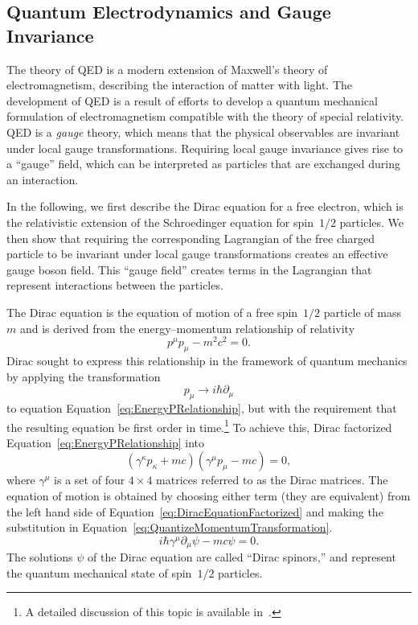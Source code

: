 \subsection{Quantum Electrodynamics and Gauge Invariance}
\label{sec:QEDandGaugeInvariance}
%
The theory of QED is a modern extension of Maxwell's theory of
electromagnetism, describing the interaction of matter with light.  The
development of QED is a result of efforts to develop a quantum mechanical
formulation of electromagnetism compatible with the theory of special relativity.
QED is a \emph{gauge} theory, which means that the physical observables are
invariant under local gauge transformations.  Requiring local gauge
invariance gives rise to a ``gauge'' field, which can be interpreted as 
particles that are exchanged during an interaction.  

In the following, we first describe the Dirac equation for a free electron,
which is the relativistic extension of the Schroedinger equation for spin~$1/2$
particles.  We then show that requiring the corresponding Lagrangian of the free
charged particle to be invariant under local gauge transformations creates an
effective gauge boson field.  This ``gauge field'' creates terms in the
Lagrangian that represent interactions between the particles.

The Dirac equation is the equation of motion of a free spin~$1/2$ particle of
mass~$m$ and is derived from the energy--momentum relationship of relativity
\begin{equation}
  p^{\mu}p_\mu - m^2c^2 = 0.
  \label{eq:EnergyPRelationship}
\end{equation}
Dirac sought to express this relationship in the framework of quantum mechanics
by applying the transformation
\begin{equation}
  p_\mu \to i \hbar \partial_\mu 
  \label{eq:QuantizeMomentumTransformation}
\end{equation}
to equation Equation~\ref{eq:EnergyPRelationship}, but with the requirement that
the resulting equation be first order in time.\footnote{A detailed
discussion of this topic is available in~\cite{Griffiths:IntroParticle}.}
To achieve this, Dirac factorized Equation~\ref{eq:EnergyPRelationship} into 
\begin{equation}
  (\gamma^\kappa p_\kappa + mc)(\gamma^\mu p_\mu - mc) = 0,
  \label{eq:DiracEquationFactorized}
\end{equation}
where $\gamma^\mu$ is a set of four $4\times4$ matrices referred to as the Dirac
matrices.  The equation of motion is obtained by choosing either term (they are
equivalent) from the
left hand side of Equation~\ref{eq:DiracEquationFactorized} and
making the substitution in Equation~\ref{eq:QuantizeMomentumTransformation}.
\begin{equation}
  i \hbar \gamma^\mu \partial_\mu \psi - mc \psi = 0.
  \label{eq:DiracEquation}
\end{equation}
The solutions $\psi$ of the Dirac equation are called ``Dirac spinors,'' and
represent the quantum mechanical state of spin~$1/2$ particles.

